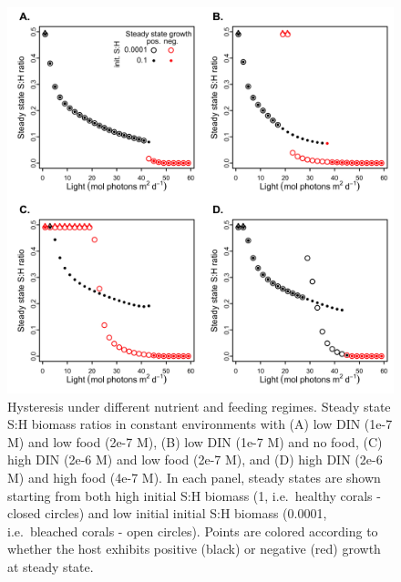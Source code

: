 \documentclass[]{elsarticle} %
\makeatletter
\def\maxwidth{\ifdim\Gin@nat@width>\linewidth\linewidth
\else\Gin@nat@width\fi}
\let\Oldincludegraphics\includegraphics
\renewcommand{\includegraphics}[1]{\Oldincludegraphics[width=\maxwidth]{#1}}
\makeatother
\begin{document}
\begin{figure}[htbp]
\centering
\includegraphics{../img/Fig8.png}
\caption{Hysteresis under different nutrient and feeding regimes. Steady
state S:H biomass ratios in constant environments with (A) low DIN (1e-7
M) and low food (2e-7 M), (B) low DIN (1e-7 M) and no food, (C) high DIN
(2e-6 M) and low food (2e-7 M), and (D) high DIN (2e-6 M) and high food
(4e-7 M). In each panel, steady states are shown starting from both high
initial S:H biomass (1, i.e.~healthy corals - closed circles) and low
initial initial S:H biomass (0.0001, i.e.~bleached corals - open
circles). Points are colored according to whether the host exhibits
positive (black) or negative (red) growth at steady state.}
\end{figure}
\end{document}
